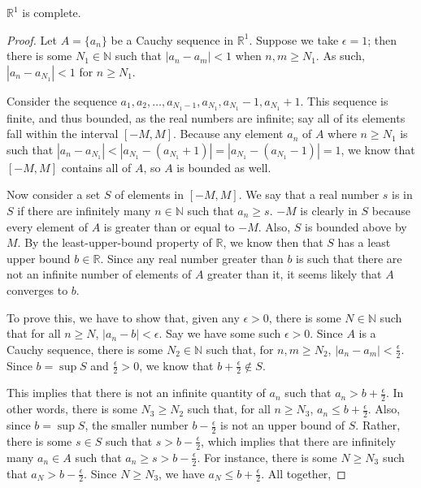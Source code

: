 \documentclass[12pt]{article}
\begin{document}
\begin{thm}
  $\mathbb{R}^1$ is complete.

  \begin{proof}
    Let $A = \{a_n\}$ be a Cauchy sequence in $\mathbb{R}^1$. Suppose we take
    $\epsilon = 1$; then there is some $N_1 \in \mathbb{N}$ such that $|a_n - a_m| <
    1$ when $n,m \geq N_1$. As such, $|a_n - a_{N_1}| < 1$ for $n \geq N_1$.

    Consider the sequence $a_1,a_2,\ldots,a_{N_1 - 1},a_{N_1},a_{N_1} - 1, a_{N_1} +
    1$. This sequence is finite, and thus bounded, as the real numbers are infinite;
    say all of its elements fall within the interval $[-M,M]$. Because any element
    $a_n$ of $A$ where $n \geq N_1$ is such that $|a_n - a_{N_1}| < |a_{N_1} -
    (a_{N_1} + 1)| = |a_{N_1} - (a_{N_1} - 1)| = 1$, we know that $[-M,M]$ contains
    all of $A$, so $A$ is bounded as well.

    Now consider a set $S$ of elements in $[-M,M]$. We say that a real number $s$ is
    in $S$ if there are infinitely many $n \in \mathbb{N}$ such that $a_n \geq s$.
    $-M$ is clearly in $S$ because every element of $A$ is greater than or equal to
    $-M$. Also, $S$ is bounded above by $M$. By the least-upper-bound property of
    $\mathbb{R}$, we know then that $S$ has a least upper bound $b \in \mathbb{R}$.
    Since any real number greater than $b$ is such that there are not an infinite
    number of elements of $A$ greater than it, it seems likely that $A$ converges to
    $b$.

    To prove this, we have to show that, given any $\epsilon > 0$, there is some $N
    \in \mathbb{N}$ such that for all $n \geq N$, $|a_n - b| < \epsilon$. Say we have
    some such $\epsilon > 0$. Since $A$ is a Cauchy sequence, there is some $N_2 \in
    \mathbb{N}$ such that, for $n,m \geq N_2$, $|a_n - a_m| < \frac{\epsilon}{2}$.
    Since $b = \sup S$ and $\frac{\epsilon}{2} > 0$, we know that $b +
    \frac{\epsilon}{2} \notin S$.

    This implies that there is not an infinite quantity of $a_n$ such that $a_n > b +
    \frac{\epsilon}{2}$. In other words, there is some $N_3 \geq N_2$ such that, for
    all $n \geq N_3$, $a_n \leq b + \frac{\epsilon}{2}$. Also, since $b = \sup S$,
    the smaller number $b - \frac{\epsilon}{2}$ is not an upper bound of $S$. Rather,
    there is some $s \in S$ such that $s > b - \frac{\epsilon}{2}$, which implies
    that there are infinitely many $a_n \in A$ such that $a_n \geq s > b -
    \frac{\epsilon}{2}$. For instance, there is some $N \geq N_3$ such that $a_N > b
    - \frac{\epsilon}{2}$. Since $N \geq N_3$, we have $a_N \leq b +
    \frac{\epsilon}{2}$. All together,


\end{proof}
\end{thm}
\end{document}
